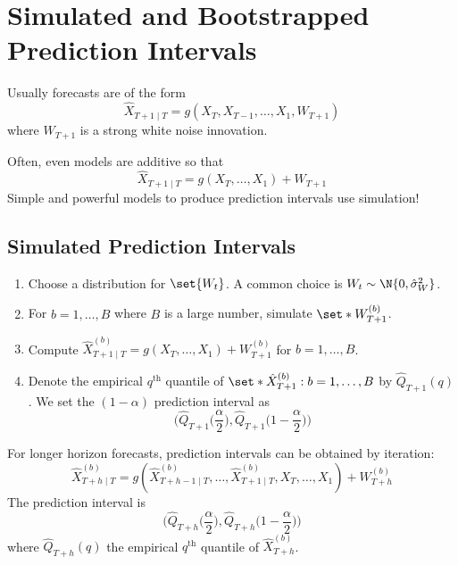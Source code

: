 \section{Simulated and Bootstrapped Prediction Intervals}
Usually forecasts are of the form
\[ \hat{X}_{T+1\mid T}=g(X_T,X_{T-1},\ldots,X_1,W_{T+1}) \]
where $ W_{T+1} $ is a strong white noise innovation.

Often, even models are additive so that
\[ \hat{X}_{T+1\mid T}=g(X_T,\ldots,X_1)+W_{T+1} \]
Simple and powerful models to produce prediction intervals
use simulation!
\subsection*{Simulated Prediction Intervals}
\begin{enumerate}[(1)]
    \item Choose a distribution for $ \set{W_t} $. A common choice is $ W_t \sim \N{0,\hat{\sigma}_W^2} $.
    \item For $ b=1,\ldots,B $ where $ B $ is a large number, simulate $ \set*{W_{T+1}^{(b)}} $.
    \item Compute $ \hat{X}_{T+1\mid T}^{(b)}=g(X_{T},\ldots,X_1)+W_{T+1}^{(b)} $
          for $ b=1,\ldots,B $.
    \item Denote the empirical $ q^{\text{th}} $ quantile of $ \set*{\hat{X}_{T+1}^{(b)}:b=1,\ldots,B} $
          by $ \hat{Q}_{T+1}(q) $. We set the $ (1-\alpha) $ prediction interval as
          \[ \biggl(\hat{Q}_{T+1}\biggl(\frac{\alpha}{2} \biggr),\hat{Q}_{T+1}\biggl(1-\frac{\alpha}{2} \biggr)\biggr) \]
\end{enumerate}
\begin{Remark}{}{}
    For longer horizon forecasts, prediction intervals can be obtained by iteration:
    \[ \hat{X}_{T+h\mid T}^{(b)}=g(\hat{X}_{T+h-1\mid T}^{(b)},\ldots,\hat{X}_{T+1\mid T}^{(b)},X_T,\ldots,X_1)+W_{T+h}^{(b)} \]
    The prediction interval is
    \[ \biggl(\hat{Q}_{T+h}\biggl(\frac{\alpha}{2} \biggr),\hat{Q}_{T+h}\biggl(1-\frac{\alpha}{2} \biggr)\biggr) \]
    where $ \hat{Q}_{T+h}(q) $ the empirical $ q^{\text{th}} $ quantile of $ \hat{X}_{T+h}^{(b)} $.
\end{Remark}
